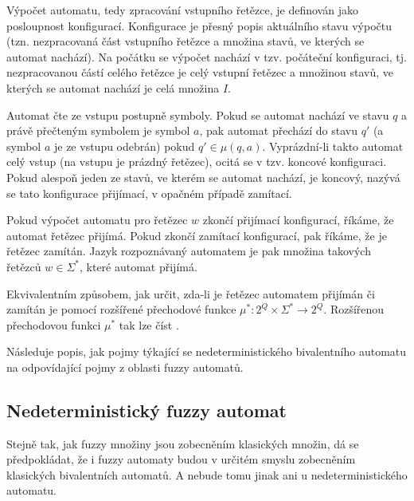 \documentclass[a4paper,10pt]{article}
\begin{document}

Výpočet automatu, tedy zpracování vstupního řetězce, je definován jako posloupnost konfigurací. Konfigurace je přesný popis aktuálního stavu výpočtu (tzn. nezpracovaná část vstupního řetězce a množina stavů, ve kterých se automat nachází). Na počátku se výpočet nachází v tzv. počáteční konfiguraci, tj. nezpracovanou částí celého řetězce je celý vstupní řetězec a množinou stavů, ve kterých se automat nachází je celá množina $I$.

Automat čte ze vstupu postupně symboly. Pokud se automat nachází ve stavu $q$ a právě přečteným symbolem je symbol $a$, pak automat přechází do stavu $q'$ (a symbol $a$ je ze vstupu odebrán) pokud $q' \in \mu(q, a)$. Vyprázdní-li takto automat celý vstup (na vstupu je prázdný řetězec), ocitá se v tzv. koncové konfiguraci. Pokud alespoň jeden ze stavů, ve kterém se automat nachází, je koncový, nazývá se tato konfigurace přijímací, v opačném případě zamítací.

Pokud výpočet automatu pro řetězec $w$ zkončí přijímací konfigurací, říkáme, že automat řetězec přijímá. Pokud zkončí zamítací konfigurací, pak říkáme, že je řetězec zamítán. Jazyk rozpoznávaný automatem je pak množina takových řetězců $w \in \Sigma^*$, které automat přijímá.

Ekvivalentním způsobem, jak určit, zda-li je řetězec automatem přijímán či zamítán je pomocí rozšířené přechodové funkce $\mu^*: 2^Q \times \Sigma^* \rightarrow 2^Q$. Rozšířenou přechodovou funkci $\mu^*$ tak lze číst .  

Následuje popis, jak pojmy týkající se nedeterministického bivalentního automatu  na odpovídající pojmy z oblasti fuzzy automatů. 

\subsection{Nedeterministický fuzzy automat}
Stejně tak, jak fuzzy množiny jsou zobecněním klasických  množin, dá se předpokládat, že i fuzzy automaty budou v určitém smyslu zobecněním klasických bivalentních automatů. A nebude tomu jinak ani u nedeterministického automatu.
\end{document}
